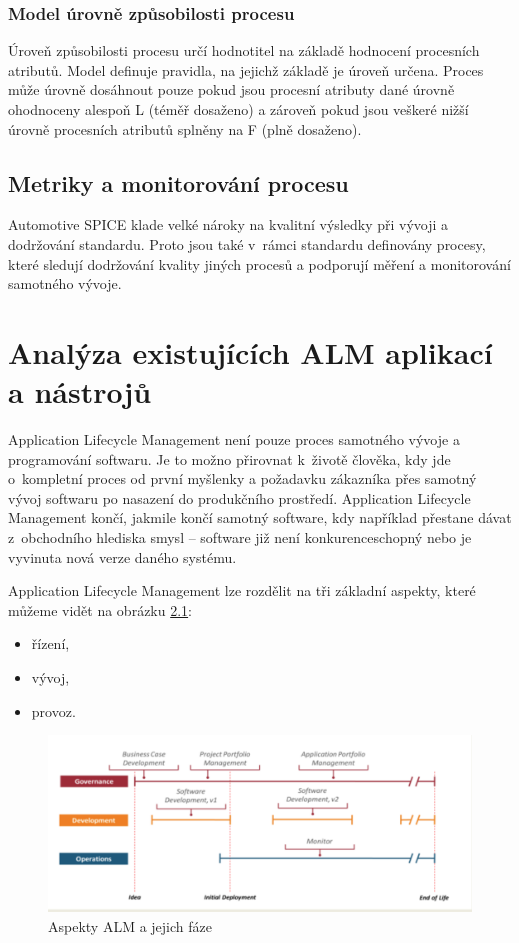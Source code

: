 \documentclass[czech,master]{diploma}
\begin{document}
\subsection{Model úrovně způsobilosti procesu}
Úroveň způsobilosti procesu určí hodnotitel na základě hodnocení procesních atributů. Model definuje  pravidla, na jejichž základě je úroveň určena. Proces může úrovně dosáhnout pouze pokud jsou procesní atributy dané úrovně ohodnoceny alespoň L (téměř dosaženo) a zároveň pokud jsou veškeré nižší úrovně procesních atributů splněny na F (plně dosaženo).


\section{Metriky a monitorování procesu}
Automotive SPICE klade velké nároky na kvalitní výsledky při vývoji a dodržování standardu. Proto jsou také v~rámci standardu definovány procesy, které sledují dodržování kvality jiných procesů a podporují měření a monitorování samotného vývoje.



\chapter{Analýza existujících ALM aplikací a nástrojů}
\label{sec:alm}
Application Lifecycle Management není pouze proces samotného vývoje a programování softwaru. Je to možno přirovnat k~životě člověka, kdy jde o~kompletní proces od první myšlenky a požadavku zákazníka přes samotný vývoj softwaru po nasazení do produkčního prostředí. Application Lifecycle Management končí, jakmile končí samotný software, kdy například přestane dávat z~obchodního hlediska smysl -- software již není konkurenceschopný nebo je vyvinuta nová verze daného systému. \cite{alm_chappell}

Application Lifecycle Management lze rozdělit na tři základní aspekty, které můžeme vidět na obrázku \ref{fig:alm}:

\begin{itemize}
  \item řízení,
  \item vývoj,
  \item provoz.
\end{itemize}

\begin{figure}[!ht]
    \centering
    \includegraphics[width=1\textwidth]{Diplomka/Figures/alm.png}
    \caption{Aspekty ALM a jejich fáze \cite{alm_chappell}}
    \label{fig:alm}
\end{figure}
\end{document}
